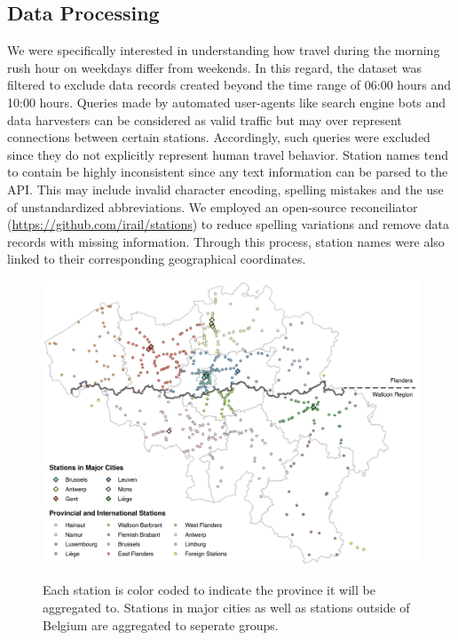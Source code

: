 \documentclass{sig-alternate}
\begin{document}
\subsection{Data Processing}

We were specifically interested in understanding how travel during the morning rush hour on weekdays differ from weekends. In this regard, the dataset was filtered to exclude data records created beyond the time range of 06:00 hours and 10:00 hours.
Queries made by automated user-agents like search engine bots and data harvesters can be considered as valid traffic but may over represent connections between certain stations.
Accordingly, such queries were excluded since they do not explicitly represent human travel behavior.
Station names tend to contain be highly inconsistent since any text information can be parsed to the API.
This may include invalid character encoding, spelling mistakes and the use of unstandardized abbreviations.
We employed an open-source reconciliator (\url{https://github.com/irail/stations}) to reduce spelling variations and remove data records with missing information. 
Through this process, station names were also linked to their corresponding geographical coordinates.

\begin{figure}
  \centering
  \includegraphics[width=14cm]{method-c.pdf}\\
  \caption{Each station is color coded to indicate the province it will be aggregated to. Stations in major cities as well as stations outside of Belgium are aggregated to seperate groups.}
  \label{fig:method-c}
\end{figure}
\end{document}
